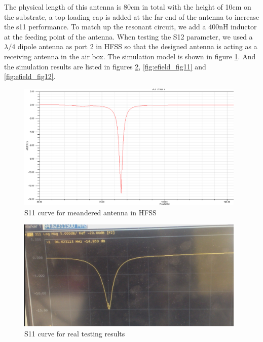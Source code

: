 The physical length of this antenna is 80cm in total with the height of 10cm on the substrate, a top loading cap is added at the far end of the antenna to increase the s11 performance. To match up the resonant circuit, we add a 400nH inductor at the feeding point of the antenna. When testing the S12 parameter, we used a $\lambda/4$ dipole antenna as port 2 in HFSS so that the designed antenna is acting as a receiving antenna in the air box. The simulation model is shown in figure \ref{fig:efield_fig9}. And the simulation results are listed in figures \ref{fig:efield_fig10}, \ref{fig:efield_fig11} and \ref{fig:efield_fig12}.

\begin{figure}[h]
	\begin{center}
		\includegraphics[width=4.3in]{./images/efield_image7.png}
		\caption{S11 curve for meandered antenna in HFSS}
		\label{fig:efield_fig9}
	\end{center}
\end{figure}

\begin{figure}[h]
	\begin{center}
		\includegraphics[width=4.3in]{./images/efield_image8.png}
		\caption{ S11 curve for real testing results}
		\label{fig:efield_fig10}
	\end{center}
\end{figure}


